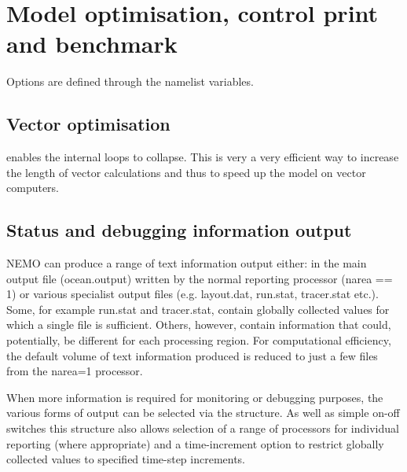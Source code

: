 \documentclass[../main/NEMO_manual]{subfiles}
\begin{document}
\section{Model optimisation, control print and benchmark}
\label{sec:MISC_opt}

\begin{listing}
  \caption{}
  \label{lst:namctl}
\end{listing}

Options are defined through the   namelist variables.

\subsection{Vector optimisation}

 enables the internal loops to collapse.
This is very a very efficient way to increase the length of vector calculations and thus
to speed up the model on vector computers.



\subsection{Status and debugging information output}


NEMO can produce a range of text information output either: in the main output
file (ocean.output) written by the normal reporting processor (narea == 1) or various
specialist output files (e.g. layout.dat, run.stat, tracer.stat etc.). Some, for example
run.stat and tracer.stat, contain globally collected values for which a single file is
sufficient. Others, however, contain information that could, potentially, be different
for each processing region. For computational efficiency, the default volume of text
information produced is reduced to just a few files from the narea=1 processor.

When more information is required for monitoring or debugging purposes, the various
forms of output can be selected via the  structure. As well as simple
on-off switches this structure also allows selection of a range of processors for
individual reporting (where appropriate) and a time-increment option to restrict
globally collected values to specified time-step increments.
\end{document}
